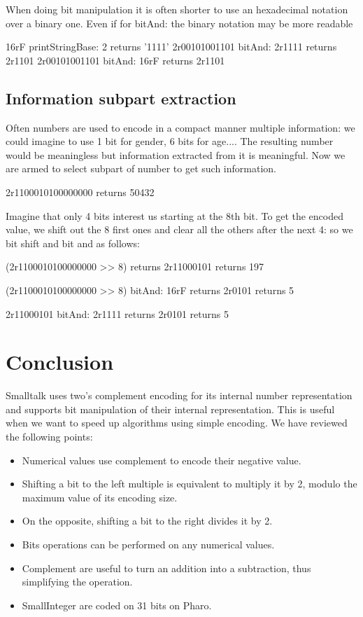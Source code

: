 \documentclass[a4paper,10pt,twoside]{book}
\begin{document}
When doing bit manipulation it is often shorter to use an hexadecimal notation over a binary one. Even if for bitAnd: the binary notation may be more readable
\begin{code}{}
16rF printStringBase: 2
	returns '1111'
2r00101001101 bitAnd: 2r1111	
	returns 2r1101
2r00101001101 bitAnd: 16rF
	returns 2r1101
\end{code}


\subsection*{Information subpart extraction}
Often numbers are used to encode in a compact manner multiple information: we could imagine to use 1 bit for gender, 6 bits for age.... The resulting number would be meaningless but information extracted from it is meaningful.
Now we are armed to select subpart of number to get such information. 

\begin{code}{}
2r1100010100000000 
	returns 50432
\end{code}

Imagine that only 4 bits interest us starting at the 8th bit.
To get the encoded value, we shift out the 8 first ones and clear all the others after the next 4: so we bit shift and bit and as follows:

\begin{code}{}
(2r1100010100000000 >> 8)
	returns 2r11000101
	returns 197

(2r1100010100000000 >> 8) bitAnd: 16rF	
	returns 2r0101	
	returns 5
	
2r11000101 bitAnd: 2r1111
	returns 2r0101	
	returns 5
\end{code}

\section{Conclusion}

Smalltalk uses two's complement encoding for its internal number representation and supports  bit manipulation of their internal representation. This is useful when we want to speed up algorithms using simple encoding. We have reviewed the following points:

\begin{itemize}
\item Numerical values use complement to encode their negative value.
\item Shifting a bit to the left multiple is equivalent to multiply it by 2, modulo the maximum value of its encoding size.
\item On the opposite, shifting a bit to the right divides it by 2.
\item Bits operations can be performed on any numerical values.
\item Complement are useful to turn an addition into a subtraction, thus simplifying the operation.
\item SmallInteger are coded on 31 bits on Pharo.
\end{itemize}

\ifx\wholebook\relax\else
   
   
\end{document}
